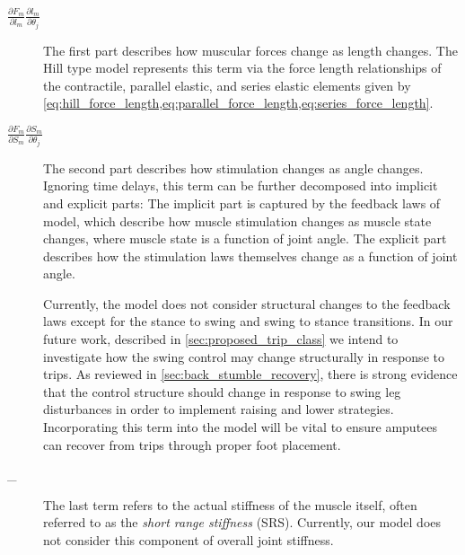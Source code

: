 \begin{description}
    \item[$\frac{\partial F_m}{\partial l_m} \frac{\partial l_m}{\partial
    \theta_j}$]  The first part describes how muscular forces change as length
    changes. The Hill type model represents this term via the force length
    relationships of the contractile, parallel elastic, and series elastic
    elements given by
    \cref{eq:hill_force_length,eq:parallel_force_length,eq:series_force_length}.

    \item[$\frac{\partial F_m}{\partial S_m} 
        \frac{\partial S_m}{\partial \theta_j}$] The second part describes how
        stimulation changes as angle changes. Ignoring time delays, this term
        can be further decomposed into implicit and explicit parts: The implicit
        part is captured by the feedback laws of model, which describe how
        muscle stimulation changes as muscle state changes, where muscle state
        is a function of joint angle.  The explicit part describes how the
        stimulation laws themselves change as a function of joint angle.

        Currently, the model does not consider structural changes to the
        feedback laws except for the stance to swing and swing to stance
        transitions. In our future work, described in
        \cref{sec:proposed_trip_class} we intend to investigate how the swing
        control may change structurally in response to trips. As reviewed in
        \cref{sec:back_stumble_recovery}, there is strong evidence that the
        control structure should change in response to swing leg disturbances in
        order to implement raising and lower strategies. Incorporating this term
        into the model will be vital to ensure amputees can recover from trips
        through proper foot placement.
        
    \item[_] The last term
    refers to the actual stiffness of the muscle itself, often referred to as
    the \emph{short range stiffness} (SRS). Currently, our model does not
    consider this component of overall joint stiffness. 
        
\end{description}
